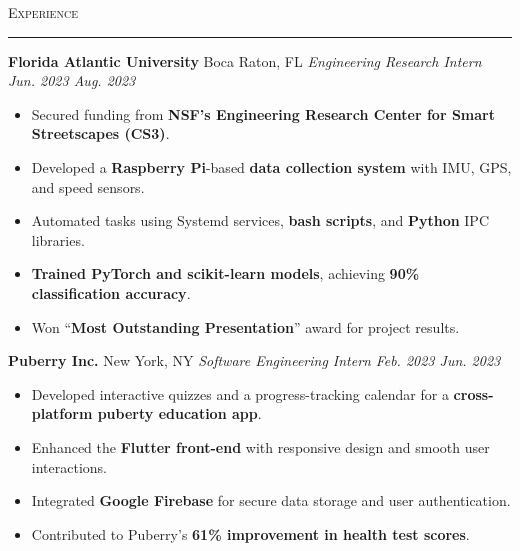 \documentclass[11pt,letterpaper]{article}
\begin{document}
\vspace{4pt}
\textsc{\large{Experience}} 
\vspace{4pt}
\hrule
\begin{list}{}{\setlength{\leftmargin}{1em}\setlength{\rightmargin}{2pt}}
  
    \item
        \normalsize{\textbf{Florida Atlantic University}} \hfill Boca Raton, FL
          \vspace{2pt} \newline
          \small{\textit{Engineering Research Intern}} \hfill \small{\textit{Jun. 2023 \textendash \space Aug. 2023}}
          \vspace{0pt}
          \begin{itemize}[itemsep=-5pt, topsep=-2pt]
              \item Secured funding from \textbf{NSF's Engineering Research Center for Smart Streetscapes (CS3)}.
              \item Developed a \textbf{Raspberry Pi}-based \textbf{data collection system} with IMU, GPS, and speed sensors.
              \item Automated tasks using Systemd services, \textbf{bash scripts}, and \textbf{Python} IPC libraries.
              \item \textbf{Trained PyTorch and scikit-learn models}, achieving \textbf{90\% classification accuracy}.
              \item Won ``\textbf{Most Outstanding Presentation}'' award for project results.
          \end{itemize}
          \vspace{4pt}

    \item
        \normalsize{\textbf{Puberry Inc.}} \hfill New York, NY
          \vspace{2pt} \newline
          \small{\textit{Software Engineering Intern}} \hfill \small{\textit{Feb. 2023 \textendash \space Jun. 2023}}
          \vspace{0pt}
          \begin{itemize}[itemsep=-4pt, topsep=-2pt]
              \item Developed interactive quizzes and a progress-tracking calendar for a \textbf{cross-platform puberty education app}.
              \item Enhanced the \textbf{Flutter front-end} with responsive design and smooth user interactions.
              \item Integrated \textbf{Google Firebase} for secure data storage and user authentication.
              \item Contributed to Puberry's \textbf{61\% improvement in health test scores}.
          \end{itemize}
\end{list}
\end{document}
